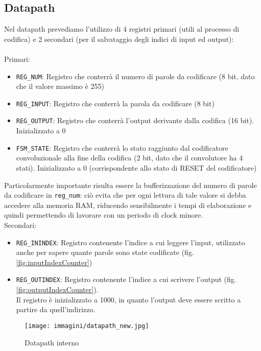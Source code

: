 \documentclass{article}
\begin{document}
\subsection{Datapath}
\label{datapath}
Nel datapath prevediamo l'utilizzo di 4 registri primari (utili al processo di codifica) e 2 secondari (per il salvataggio degli indici di input ed output):
\\\\
Primari:
\begin{itemize}
    \item \texttt{REG\_NUM}: Registro che conterrà il numero di parole da codificare (8 bit, dato che il valore massimo è 255)
    \item \texttt{REG\_INPUT}: Registro che conterrà la parola da codificare (8 bit)
    \item \texttt{REG\_OUTPUT}: Registro che conterrà l'output derivante dalla codifica (16 bit). Inizializzato a 0
    \item \texttt{FSM\_STATE}: Registro che conterrà lo stato raggiunto dal codificatore convoluzionale alla fine della codifica (2 bit, dato che il convolutore ha 4 stati). Inizializzato a 0 (corrispondente allo stato di RESET del codificatore)
\end{itemize}

Particolarmente importante risulta essere la bufferizzazione del numero di parole da codificare in \texttt{reg\_num}: ciò evita che per ogni lettura di tale valore si debba accedere alla memoria RAM, riducendo sensibilmente i tempi di elaborazione e quindi permettendo di lavorare con un periodo di clock minore.\\

Secondari:
\begin{itemize}
    \item \texttt{REG\_ININDEX}: Registro contenente l'indice a cui leggere l'input, utilizzato anche per sapere quante parole sono state codificate (fig. \ref{fig:inputIndexCounter})
    \item \texttt{REG\_OUTINDEX}: Registro contenente l'indice a cui scrivere l'output (fig. \ref{fig:outputIndexCounter}).\\
    Il registro è inizializzato a 1000, in quanto l'output deve essere scritto a partire da quell'indirizzo.
\end{itemize}

\begin{figure}[h!]
    \centering
    \texttt{[image: immagini/datapath\_new.jpg]}
    \caption{Datapath interno}
    \label{fig:datapath}
\end{figure}
\end{document}
